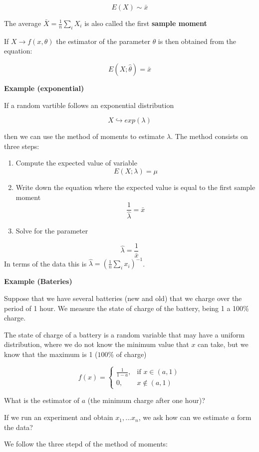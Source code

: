 \documentclass[
]{book}
\begin{document}
\[E(X)\sim \bar{x}\]

The average \(\bar{X}= \frac{1}{n}\sum_i X_i\) is also called the first \textbf{sample moment}

If \(X \rightarrow f(x, \theta)\) the estimator of the parameter \(\theta\) is then obtained from the equation:

\[E(X; \hat{\theta})=\bar{x}\]

\textbf{Example (exponential)}

If a random vartible follows an exponential distribution

\[X \hookrightarrow exp(\lambda)\]

then we can use the method of moments to estimate \(\lambda\). The method consists on three steps:

\begin{enumerate}
\def\labelenumi{\arabic{enumi}.}
\item
  Compute the expected value of variable \[E(X; \lambda)=\mu\]
\item
  Write down the equation where the expected value is equal to the first sample moment \[\frac{1}{\hat{\lambda}}=\bar{x}\]
\item
  Solve for the parameter
\end{enumerate}

\[\hat{\lambda}=\frac{1}{\bar{x}}\]
In terms of the data this is \(\hat{\lambda}=(\frac{1}{n}\sum_i x_i)^{-1}\).

\textbf{Example (Bateries)}

Suppose that we have several batteries (new and old) that we charge over the period of 1 hour. We measure the state of charge of the battery, being 1 a 100\% charge.

The state of charge of a battery is a random variable that may have a uniform distribution, where we do not know the minimum value that \(x\) can take, but we know that the maximum is 1 (\(100\%\) of charge)

\[
f(x)=
\begin{cases}
    \frac{1}{1-a},& \text{if } x\in (a,1)\\
    0,& x\notin (a,1)
\end{cases}
\]

What is the estimator of \(a\) (the minimum charge after one hour)?

If we run an experiment and obtain \(x_1,...x_n\), we ask how can we estimate \(a\) form the data?

We follow the three stepd of the method of moments:
\end{document}

